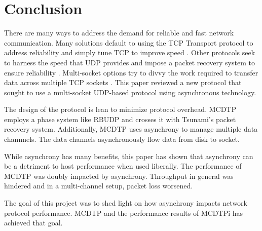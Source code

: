 \chapter{Conclusion}

There are many ways to address the demand for reliable and fast network communication. Many solutions default to using the TCP Transport protocol to address reliability and simply tune TCP to improve speed \cite{brakmo1995tcp}\cite{wei2006fast}\cite{ha2008cubic}. Other protocols seek to harness the speed that UDP provides and impose a packet recovery system to ensure reliability \cite{He2002}\cite{Aspera2016}\cite{Fan2010}\cite{Meiss2007}\cite{gu2007udt}. Multi-socket options try to divvy the work required to transfer data across multiple TCP sockets \cite{Allman1995}\cite{Allman1997}\cite{Sivakumar2000psockets}. This paper reviewed a new protocol that sought to use a multi-socket UDP-based protocol using asynchronous technology. 

The design of the protocol is lean to minimize protocol overhead. MCDTP employs a phase system like RBUDP and crosses it with Tsunami's packet recovery system. Additionally, MCDTP uses asynchrony to manage multiple data channnels. The data channels asynchronously flow data from disk to socket.

While asynchrony has many benefits, this paper has shown that asynchrony can be a detriment to host performance when used liberally. The performance of MCDTP was doubly impacted by asynchrony. Throughput in general was hindered and in a multi-channel setup, packet loss worsened.

The goal of this project was to shed light on how asynchrony impacts network protocol performance. MCDTP and the performance results of MCDTPi has achieved that goal.